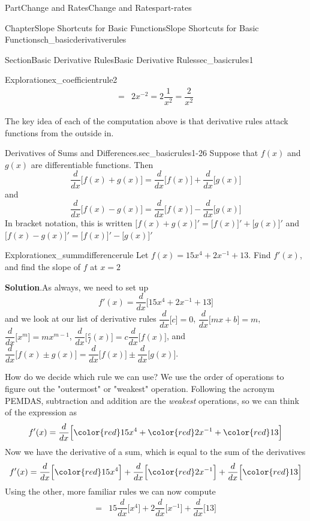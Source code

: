 \documentclass{tufte-book}
\newcommand{\blocktitlefont}{\relax}
\numberwithin{equation}{chapter}
\newcommand{\red}[1]{   {\color{red}   #1}   }
\newcommand{\ddx}[1]{ \dfrac{d}{dx} \Big[ #1 \Big]  }
\newcommand{\D}[1]{ \Big[ #1 \Big]'  }
\newcommand{\amp}{&}
\begin{document}
\begin{partptx}{Part}{Change and Rates}{}{Change and Rates}{}{}{part-rates}
\begin{chapterptx}{Chapter}{Slope Shortcuts for Basic Functions}{}{Slope Shortcuts for Basic Functions}{}{}{ch_basicderivativerules}
\begin{sectionptx}{Section}{Basic Derivative Rules}{}{Basic Derivative Rules}{}{}{sec_basicrules1}
\begin{exploration}{Exploration}{}{ex_coefficientrule2}
\begin{align*}
= \amp 2 { { x}^{-2 }  } = 2\dfrac{1}{x^2} = \dfrac{2}{x^2} 
\end{align*}
%
\end{exploration}%
The key idea of each of the computation above is that derivative rules attack functions from the outside in.%
\begin{paragraphs}{Derivatives of Sums and Differences.}{sec_basicrules1-26}%
Suppose that \(f(x)\) and \(g(x)\) are differentiable functions.  Then%
\begin{equation*}
\ddx{ f(x) + g(x) } = \ddx{f(x)} + \ddx{g(x)}
\end{equation*}
and%
\begin{equation*}
\ddx{f(x) - g(x) } = \ddx{f(x) } - \ddx{g(x)}
\end{equation*}
In bracket notation, this is written \(\D{f(x) + g(x)} = \D{f(x)} + \D{g(x)} \) and \(\D{f(x) - g(x)} = \D{f(x)} - \D{g(x)} \)%
\end{paragraphs}%
\begin{exploration}{Exploration}{}{ex_summdifferencerule}%
Let \(f(x) = 15x^4 + 2x^{-1} + 13\). Find \(f'(x)\), and find the slope of \(f\) at \(x=2\)%
\par\smallskip%
\noindent\textbf{\blocktitlefont Solution}.\hypertarget{ex_summdifferencerule-2}{}\quad{}As always, we need to set up%
\begin{equation*}
f'(x) = \ddx{ 15x^4 + 2x^{-1} + 13 }
\end{equation*}
and we look at our list of derivative rules \(\ddx{c}=0\), \(\ddx{mx+b}=m\), \(\ddx{x^m}=mx^{m-1}\),  \(\ddx{\frac cf(x)}=c\ddx{f(x)}\), and \(\ddx{f(x) \pm g(x)} = \ddx{f(x)} \pm \ddx{g(x)}\).%
\par
How do we decide which rule we can use? We use the order of operations to figure out the "outermost" or "weakest" operation. Following the acronym PEMDAS, subtraction and addition are the \emph{weakest} operations, so we can think of the expression as%
\begin{equation*}
f'(x) = \ddx{ \red{15x^4} + \red{2x^{-1}} + \red{13} }
\end{equation*}
Now we have the derivative of a sum, which is equal to the sum of the derivatives%
\begin{equation*}
f'(x) = \ddx{ \red{15x^4} } + \ddx{ \red{2x^{-1} } } + \ddx{\red{13}} 
\end{equation*}
Using the other, more familiar rules we can now compute%
\begin{align*}
= \amp 15\ddx{x^4} + 2\ddx{x^{-1}} + \ddx{13}\\

\end{align*}
\end{exploration}
\end{sectionptx}
\end{chapterptx}
\end{partptx}
\end{document}
